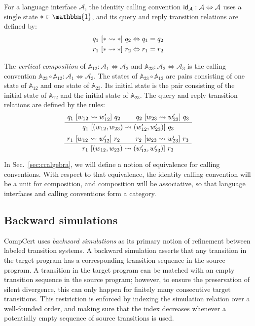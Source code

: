 \begin{definition}
For a language interface $\mathcal{A}$,
the identity calling convention
$ \textsf{id} _\mathcal{A} : \mathcal{A} \Leftrightarrow \mathcal{A}$
uses a single state $* \in \mathbbm{1}$,
and its query and reply transition relations are defined by:
\begin{gather*}
  q_1 \ [{* \leadsto *}]\  q_2 \Leftrightarrow q_1 = q_2 \\
  r_1 \ [{* \leadsto *}]\  r_2 \Leftrightarrow r_1 = r_2
\end{gather*}
\end{definition}

\begin{definition}
The \emph{vertical composition} of
$\mathbb{A}_{12} : \mathcal{A}_1 \Leftrightarrow \mathcal{A}_2$ and
$\mathbb{A}_{23} : \mathcal{A}_2 \Leftrightarrow \mathcal{A}_3$
is the calling convention
$\mathbb{A}_{23} \circ \mathbb{A}_{12} :
 \mathcal{A}_1 \Leftrightarrow \mathcal{A}_3$.
The states of $\mathbb{A}_{23} \circ \mathbb{A}_{12}$
are pairs consisting of
one state of $\mathbb{A}_{12}$ and
one state of $\mathbb{A}_{23}$.
Its initial state is the pair consisting of
the initial state of $\mathbb{A}_{12}$ and
the initial state of $\mathbb{A}_{23}$.
The query and reply transition relations are defined
by the rules:
\[
  \AxiomC{$q_1 \ifr{w_{12} \leadsto w_{12}'} q_2$}
  \AxiomC{$q_2 \ifr{w_{23} \leadsto w_{23}'} q_3$}
  \BinaryInfC{$q_1 \ifr{(w_{12}, w_{23}) \leadsto (w_{12}', w_{23}')} q_3$}
  \DisplayProof
\]
\[
  \AxiomC{$r_1 \ifr{w_{12} \leadsto w_{12}'} r_2$}
  \AxiomC{$r_2 \ifr{w_{23} \leadsto w_{23}'} r_3$}
  \BinaryInfC{$r_1 \ifr{(w_{12}, w_{23}) \leadsto (w_{12}', w_{23}')} r_3$}
  \DisplayProof
\]
\end{definition}

In Sec.~\ref{sec:ccalgebra},
we will define a notion of equivalence for calling conventions.
With respect to that equivalence,
the identity calling convention will be a unit for composition,
and composition will be associative,
so that language interfaces and calling conventions
form a category.


\subsection{Backward simulations} %

CompCert uses \emph{backward simulations}
as its primary notion of refinement between labeled transition systems.
A backward simulation asserts that any transition in the target program
has a corresponding transition sequence in the source program.
A transition in the target program can be matched with
an empty transition sequence in the source program;
however, to ensure the preservation of silent divergence,
this can only happen for finitely many consecutive target transitions.
This restriction is enforced by indexing the simulation relation
over a well-founded order,
and making sure that the index decreases
whenever a potentially empty sequence of source transitions is used.

